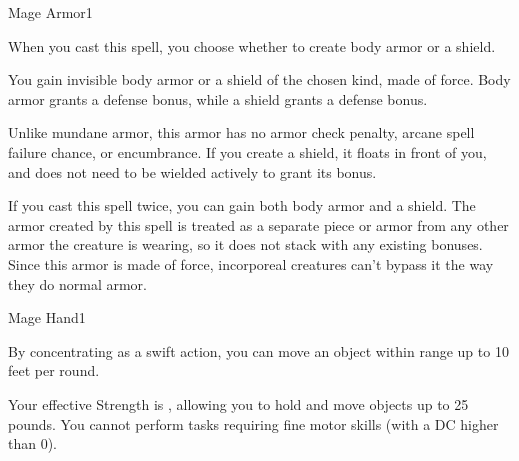 \begin{spellsection}{Mage Armor}{1}
    \begin{spellheader}
    \end{spellheader}
    \begin{spellcontent}
        \begin{spelltargetinginfo}
            \spellspecial When you cast this spell, you choose whether to create body armor or a shield.
        \end{spelltargetinginfo}
        \begin{spelleffects}
            \spelleffect You gain invisible body armor or a shield of the chosen kind, made of force. Body armor grants a  defense bonus, while a shield grants a  defense bonus.
            \par Unlike mundane armor, this armor has no armor check penalty, arcane spell failure chance, or encumbrance. If you create a shield, it floats in front of you, and does not need to be wielded actively to grant its bonus.
            \spelldur \durlong
        \end{spelleffects}
    \end{spellcontent}
    \begin{spellfooter}
        \spellnotes If you cast this spell twice, you can gain both body armor and a shield. The armor created by this spell is treated as a separate piece or armor from any other armor the creature is wearing, so it does not stack with any existing bonuses. Since this armor is made of force, incorporeal creatures can't bypass it the way they do normal armor.
        \miscastexplode
    \end{spellfooter}
\end{spellsection}

\begin{spellsection}{Mage Hand}{1}
    \begin{spellheader}
    \end{spellheader}
    \begin{spellcontent}
        \begin{spelltargetinginfo}
            \spellrng{\rngclose}
        \end{spelltargetinginfo}
        \begin{spelleffects}
            \spelleffect By concentrating as a swift action, you can move an object within range up to 10 feet per round.

            Your effective Strength is , allowing you to hold and move objects up to 25 pounds. You cannot perform tasks requiring fine motor skills (with a DC higher than 0).
            \spelldur \durshort
        \end{spelleffects}
    \end{spellcontent}
    \begin{spellfooter}
        \miscastexplode
    \end{spellfooter}
\end{spellsection}

